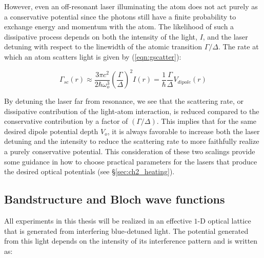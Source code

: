 However, even an off-resonant laser illuminating the atom does not act purely as a conservative potential since the photons still have a finite probability to exchange energy and momentum with the atom\cite{Grimm2000}. The likelihood of such a dissipative process depends on both the intensity of the light, $I$, and the laser detuning with respect to the linewidth of the atomic transition $\Gamma/\Delta$. The rate at which an atom scatters light is given by (\ref{eqn:gscatter}):

\begin{equation}
\label{eqn:gscatter}
	\Gamma_{sc}(r) \approx \frac{3 \pi c^2}{2 \hbar \omega_o^3} \left ( \frac{\Gamma}{\Delta} \right )^2 I(r) = \frac{1}{\hbar} \frac{\Gamma}{\Delta} V_{dipole}(r)
\end{equation}

By detuning the laser far from resonance, we see that the scattering rate, or dissipative contribution of the light-atom interaction, is reduced compared to the conservative contribution by a factor of $(\Gamma/\Delta)$. This implies that for the same desired dipole potential depth $V_o$, it is always favorable to increase both the laser detuning and the intensity to reduce the scattering rate to more faithfully realize a purely conservative potential. This consideration of these two scalings provide some guidance in how to choose practical parameters for the lasers that produce the desired optical potentials (see \S \ref{sec:ch2_heating}). 


\subsection{Bandstructure and Bloch wave functions}

All experiments in this thesis will be realized in an effective $1$-D optical lattice that is generated from interfering blue-detuned light. The potential generated from this light depends on the intensity of its interference pattern and is written as:

